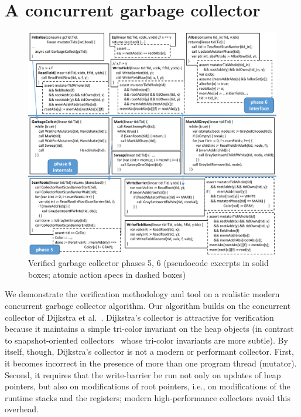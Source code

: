 \section{A concurrent garbage collector}
\label{sec:gc}

\begin{figure}
\includegraphics[scale=1.0]{VerifiedGC.pdf}
\caption{Verified garbage collector phases 5, 6 (pseudocode excerpts in solid boxes; atomic action specs in dashed boxes)}
\label{fig:VerifiedGC}
\end{figure}

We demonstrate the verification methodology and tool on a realistic modern concurrent garbage collector algorithm.
Our algorithm builds on the concurrent collector of Dijkstra et al.~\cite{dijk78}.
Dijkstra's collector is attractive for verification because it maintains a simple tri-color invariant
on the heap objects (in contrast to snapshot-oriented collectors~\cite{doli93,doli94,doma00,azat03}
whose tri-color invariants are more subtle).
By itself, though, Dijkstra's collector is not a modern or performant collector.
First, it becomes incorrect in the presence of more than one program thread (mutator).
Second, it requires that the write-barrier be run not only on updates of heap pointers,
but also on modifications of root pointers, i.e., on modifications of the runtime stacks and the registers;
modern high-performance collectors avoid this overhead.

